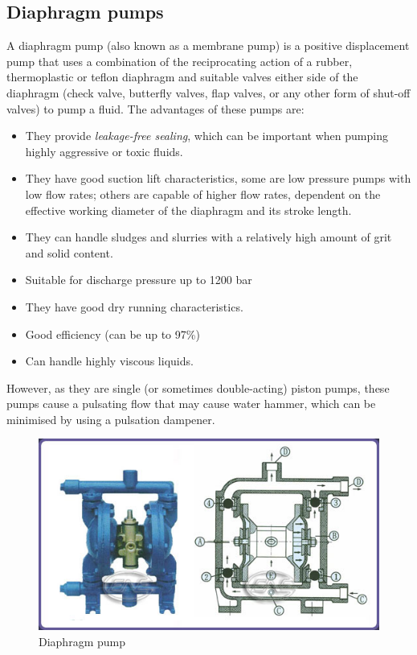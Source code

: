 \subsection{Diaphragm pumps}

A diaphragm pump (also known as a membrane pump) is a positive displacement pump that uses a combination of the reciprocating action of a rubber, thermoplastic or teflon diaphragm and suitable valves either side of the diaphragm (check valve, butterfly valves, flap valves, or any other form of shut-off valves) to pump a fluid. The advantages of these pumps are:
\begin{itemize}
\item They provide \emph{leakage-free sealing}, which can be important when pumping highly aggressive or toxic fluids.
\item They have good suction lift characteristics, some are low pressure pumps with low flow rates; others are capable of higher flow rates, dependent on the effective working diameter of the diaphragm and its stroke length. 
\item They can handle sludges and slurries with a relatively high amount of grit and solid content.
\item Suitable for discharge pressure up to 1200 bar
\item They have good dry running characteristics.
\item Good efficiency (can be up to 97\%)
\item Can handle highly viscous liquids.
\end{itemize}

However, as they are single (or sometimes double-acting) piston pumps, these pumps cause a pulsating flow that may cause water hammer, which can be minimised by using a pulsation dampener.

\begin{figure}[h!]
\begin{center}
\includegraphics[width=\textwidth]{figs/diaphragmpump61_1.jpg}
\caption{\label{fig:diap_pp} Diaphragm pump}
\end{center}
\end{figure}

